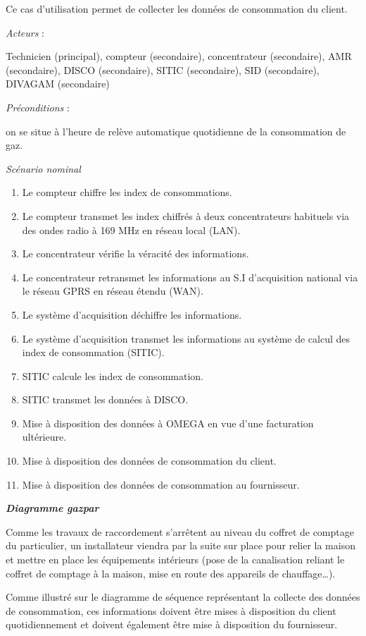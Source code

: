\documentclass[
12pt,
french,                           %
a4paper,
]{article}
\begin{document}
Ce cas d'utilisation permet de collecter les données de consommation du
client.

\emph{Acteurs} :

Technicien (principal), compteur (secondaire), concentrateur
(secondaire), AMR (secondaire), DISCO (secondaire), SITIC (secondaire),
SID (secondaire), DIVAGAM (secondaire)

\emph{Préconditions} :

on se situe à l'heure de relève automatique quotidienne de la
consommation de gaz.

\emph{Scénario nominal}

\begin{enumerate}[1.]
\item
  Le compteur chiffre les index de consommations.
\item
  Le compteur transmet les index chiffrés à deux concentrateurs
  habituels via des ondes radio à 169 MHz en réseau local (LAN).
\item
  Le concentrateur vérifie la véracité des informations.
\item
  Le concentrateur retransmet les informations au S.I d'acquisition
  national via le réseau GPRS en réseau étendu (WAN).
\item
  Le système d'acquisition déchiffre les informations.
\item
  Le système d'acquisition transmet les informations au système de
  calcul des index de consommation (SITIC).
\item
  SITIC calcule les index de consommation.
\item
  SITIC transmet les données à DISCO.
\item
  Mise à disposition des données à OMEGA en vue d'une facturation
  ultérieure.
\item
  Mise à disposition des données de consommation du client.
\item
  Mise à disposition des données de consommation au fournisseur.
\end{enumerate}

\textbf{\emph{Diagramme gazpar}}

Comme les travaux de raccordement s'arrêtent au niveau du coffret de
comptage du particulier, un installateur viendra par la suite sur place
pour relier la maison et mettre en place les équipements intérieurs
(pose de la canalisation reliant le coffret de comptage à la maison,
mise en route des appareils de chauffage\ldots{}).

Comme illustré sur le diagramme de séquence représentant la collecte des
données de consommation, ces informations doivent être mises à
disposition du client quotidiennement et doivent également être mise à
disposition du fournisseur.
\end{document}

